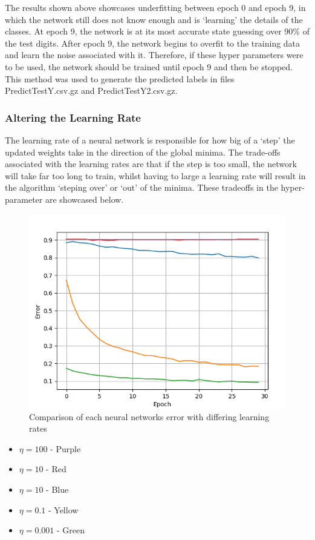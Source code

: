 \documentclass{article}
\begin{document}
The results shown above showcases underfitting between epoch 0 and epoch 9, in which the network still does not know enough and is `learning' the details of the classes. At epoch 9, the network is at its most accurate state guessing over 90\% of the test digits. After epoch 9, the network begins to overfit to the training data and learn the noise associated with it. Therefore, if these hyper parameters were to be used, the network should be trained until epoch 9 and then be stopped. This method was used to generate the predicted labels in files PredictTestY.csv.gz and PredictTestY2.csv.gz.

\subsubsection{Altering the Learning Rate}
The learning rate of a neural network is responsible for how big of a `step' the updated weights take in the direction of the global minima. The trade-offs associated with the learning rates are that if the step is too small, the network will take far too long to train, whilst having to large a learning rate will result in the algorithm `steping over' or `out' of the minima. These tradeoffs in the hyper-parameter are showcased below.

\begin{figure}[!htb]
\centering
	\includegraphics[scale=0.6]{all-lr.png}
\caption{Comparison of each neural networks error with differing learning rates}
\end{figure}

\begin{itemize}
\item $\eta = 100$ - Purple
\item $\eta = 10$ - Red
\item $\eta = 10$ - Blue
\item $\eta = 0.1$ - Yellow
\item $\eta = 0.001$ - Green
\end{itemize}
\end{document}
